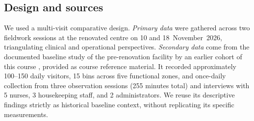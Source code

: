 \documentclass[10pt,twocolumn,a4paper]{article}
\begin{document}
\subsection{Design and sources}
We used a multi-visit comparative design. \emph{Primary data} were gathered across two fieldwork sessions at the renovated centre on 10 and 18~November~2026, triangulating clinical and operational perspectives. \emph{Secondary data} come from the documented baseline study of the pre-renovation facility by an earlier cohort of this course \cite{g8report}, provided as course reference material. It recorded approximately 100--150 daily visitors, 15 bins across five functional zones, and once-daily collection from three observation sessions (255 minutes total) and interviews with 5 nurses, 3 housekeeping staff, and 2 administrators. We reuse its descriptive findings strictly as historical baseline context, without replicating its specific measurements.
\end{document}
